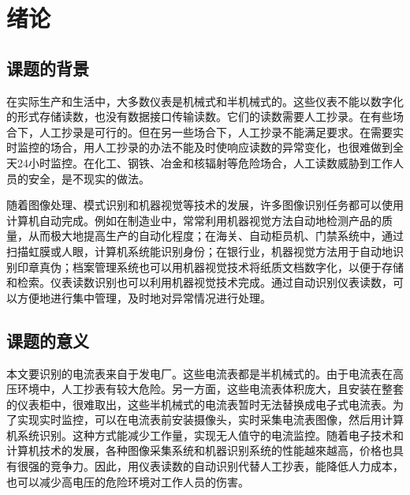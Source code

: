 
\chapter{绪论}

\section{课题的背景}

在实际生产和生活中，大多数仪表是机械式和半机械式的。这些仪表不能以数字化的形式存储读数，也没有数据接口传输读数。它们的读数需要人工抄录。在有些场合下，人工抄录是可行的。但在另一些场合下，人工抄录不能满足要求。在需要实时监控的场合，用人工抄录的办法不能及时使响应读数的异常变化，也很难做到全天24小时监控。在化工、钢铁、冶金和核辐射等危险场合，人工读数威胁到工作人员的安全，是不现实的做法。

随着图像处理、模式识别和机器视觉等技术的发展，许多图像识别任务都可以使用计算机自动完成。例如在制造业中，常常利用机器视觉方法自动地检测产品的质量，从而极大地提高生产的自动化程度；在海关、自动柜员机、门禁系统中，通过扫描虹膜或人眼，计算机系统能识别身份；在银行业，机器视觉方法用于自动地识别印章真伪；档案管理系统也可以用机器视觉技术将纸质文档数字化，以便于存储和检索。仪表读数识别也可以利用机器视觉技术完成。通过自动识别仪表读数，可以方便地进行集中管理，及时地对异常情况进行处理。



\section{课题的意义}

本文要识别的电流表来自于发电厂。这些电流表都是半机械式的。由于电流表在高压环境中，人工抄表有较大危险。另一方面，这些电流表体积庞大，且安装在整套的仪表柜中，很难取出，这些半机械式的电流表暂时无法替换成电子式电流表。为了实现实时监控，可以在电流表前安装摄像头，实时采集电流表图像，然后用计算机系统识别。这种方式能减少工作量，实现无人值守的电流监控。随着电子技术和计算机技术的发展，各种图像采集系统和机器识别系统的性能越來越高，价格也具有很强的竞争力。因此，用仪表读数的自动识别代替人工抄表，能降低人力成本，也可以减少高电压的危险环境对工作人员的伤害。


